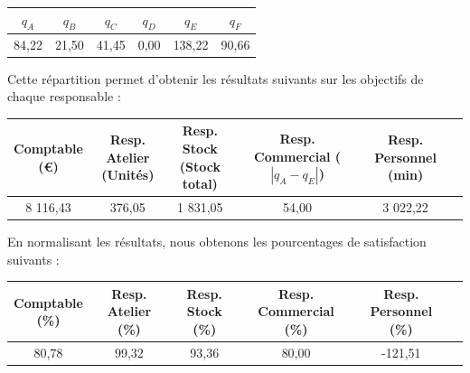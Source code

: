 \documentclass[paper=a4, fontsize=11pt]{report}
\numberwithin{equation}{section}		%
\numberwithin{figure}{section}			%
\numberwithin{table}{section}				%
\newcommand\abs[1]{\left|#1\right|}
\begin{document}
\begin{center}
\begin{tabular}{cccccc}
\hline
$q_A$ & $q_B$ & $q_C$ & $q_D$ & $q_E$ & $q_F$ \\
\hline
84,22 & 21,50 & 41,45 & 0,00 & 138,22 & 90,66 \\
\hline
\end{tabular}
\end{center}

Cette répartition permet d'obtenir les résultats suivants sur les objectifs de chaque responsable : 

\begin{table}[H]
\begin{center}
\begin{tabular}{c|ccccc}
\shortstack{Comptable \\ \scriptsize{(€)}} & \shortstack{Resp. Atelier \\ \scriptsize (Unités)} & \shortstack{Resp.  Stock \\ \scriptsize (Stock total)} & \shortstack{Resp.  Commercial \\ \scriptsize ($\abs{q_A - q_E}$)} &   \shortstack{Resp.  Personnel \\ \scriptsize (min)} \\ 
\hline 
8 116,43 & 376,05 & 1 831,05 & 54,00 & 3 022,22 \\ 
\end{tabular}
\end{center}
\end{table}

En normalisant les résultats, nous obtenons les pourcentages de satisfaction suivants : 

\begin{table}[H]
\begin{center}
\begin{tabular}{c|ccccc}
\shortstack{Comptable \\ \scriptsize{(\%)}} & \shortstack{Resp. Atelier \\ \scriptsize (\%)} & \shortstack{Resp.  Stock \\ \scriptsize (\%)} & \shortstack{Resp.  Commercial \\ \scriptsize (\%)} &   \shortstack{Resp.  Personnel \\ \scriptsize (\%)} \\ 
\hline 
80,78 & 99,32 & 93,36 & 80,00 & -121,51 \\
\end{tabular}
\end{center}
\end{table}
\end{document}
